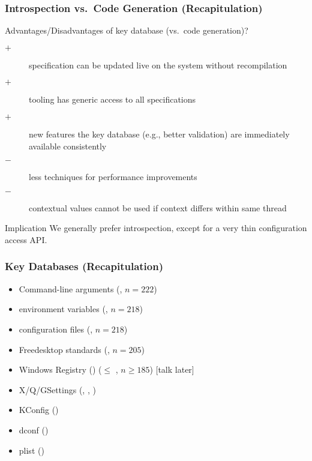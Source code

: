 \begin{frame}
	\frametitle{Introspection vs.\ Code Generation (Recapitulation)}

	\begin{task}
	Advantages/Disadvantages of key database (vs.\ code generation)?
	\end{task}

	\pause

	\begin{description} %
	\item[$+$] specification can be updated live on the system without recompilation
	\item[$+$] tooling has generic access to all specifications
 	\item[$+$] new features the key database (e.g., better validation) are immediately available consistently
	\item[$-$] less techniques for performance improvements
	\item[$-$] contextual values cannot be used if context differs within same thread
	\end{description}

	\begin{alertblock}{Implication}
	We generally prefer introspection, except for a very thin configuration access API.
	\end{alertblock}
\end{frame}

\begin{frame}
	\frametitle{Key Databases (Recapitulation)}

	\methodQuestion{} 

	\pause

	\begin{itemize}
	\item Command-line arguments (, $n=222$)
	\item environment variables (, $n=218$)
	\item configuration files (, $n=218$)
	\item Freedesktop standards (, $n=205$)
	\item Windows Registry () ($\leq$ , $n\geq185$) [talk later]
	\item X/Q/GSettings (, , )
	\item KConfig ()
	\item dconf ()
	\item plist ()
	\end{itemize}

\end{frame}

